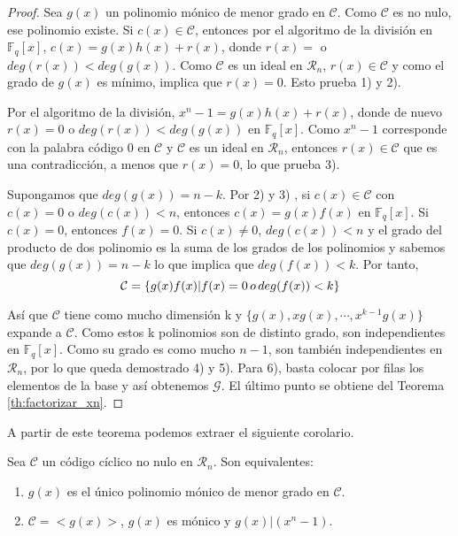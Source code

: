 \begin{proof}
Sea $g(x)$ un polinomio mónico de menor grado en $\mathcal{C}$. Como $\mathcal{C}$ es no nulo, ese polinomio existe. Si $c(x) \in \mathcal{C}$, entonces por el algoritmo de la división en $\mathbb{F}_q[x]$, $c(x) = g(x)h(x) + r(x)$, donde $r(x) = $ o $deg(r(x)) < deg(g(x))$. Como $\mathcal{C}$ es un ideal en $\mathcal{R}_n$, $r(x) \in \mathcal{C}$ y como el grado de $g(x)$ es mínimo, implica que $r(x) = 0$. Esto prueba 1) y 2).

Por el algoritmo de la división, $x^n-1 = g(x)h(x)+r(x)$, donde de nuevo $r(x) = 0$ o $deg(r(x)) < deg(g(x))$ en  $\mathbb{F}_q[x]$. Como $x^n-1$ corresponde con la palabra código $0$ en $\mathcal{C}$ y $\mathcal{C}$ es un ideal en $\mathcal{R}_n$, entonces $r(x) \in \mathcal{C}$ que es una contradicción, a menos que $r(x) = 0$, lo que prueba 3).

Supongamos que $deg(g(x)) = n-k$. Por 2) y 3) , si $c(x) \in \mathcal{C}$ con $c(x) = 0$ o $deg(c(x)) < n $, entonces $c(x) = g(x)f(x)$ en $\mathbb{F}_q[x]$. Si $c(x) = 0$, entonces $f(x) = 0$. Si $c(x) \neq 0$, $deg(c(x)) < n $ y el grado del producto de dos polinomio es la suma de los grados de los polinomios y sabemos que $deg(g(x)) = n-k$ lo que implica que $deg(f(x)) < k$. Por tanto, 
\[
\mathcal{C} = \{ g(x)f(x) | f(x) = 0 \thinspace o \thinspace deg(f(x)) < k \}
\]

Así que $\mathcal{C}$ tiene como mucho dimensión k y $\{g(x),xg(x),\cdots,x^{k-1}g(x)\}$ expande a $\mathcal{C}$. Como estos k polinomios son de distinto grado, son independientes en $\mathbb{F}_q[x]$. Como su grado es como mucho $n-1$, son también independientes en $\mathcal{R}_n$, por lo que queda demostrado 4) y 5). Para 6), basta colocar por filas los elementos de la base y así obtenemos $\mathcal{G}$. El último punto se obtiene del Teorema \ref{th:factorizar_xn}. 
\end{proof}

A partir de este teorema podemos extraer el siguiente corolario.

\begin{corollary}
\label{co:generador_unico}
Sea $\mathcal{C}$ un código cíclico no nulo en $\mathcal{R}_n$. Son equivalentes:
\begin{enumerate}
	\item $g(x)$ es el único polinomio mónico de menor grado en $\mathcal{C}$.
	\item $\mathcal{C} = <g(x)>$, $g(x)$ es mónico y $g(x) | (x^n-1)$. 
\end{enumerate}

\end{corollary}

